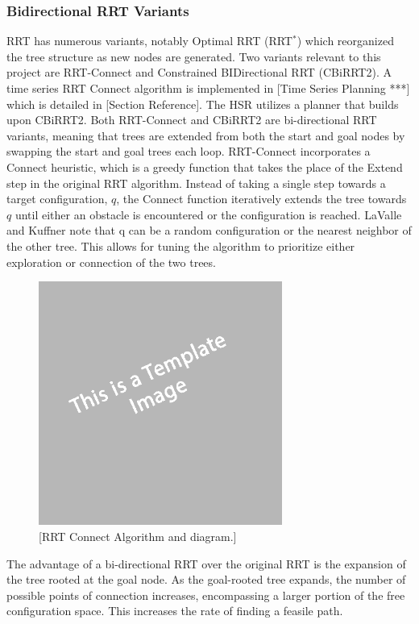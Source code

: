 \documentclass[12pt]{article}
\begin{document}
        \subsubsection{Bidirectional RRT Variants}
            RRT has numerous variants, notably Optimal RRT (RRT\(^*\)) which reorganized the tree structure as new nodes are generated. Two variants relevant to this project are RRT-Connect and Constrained BIDirectional RRT (CBiRRT2). A time series RRT Connect algorithm is implemented in [Time Series Planning ***] which is detailed in [Section Reference]. The HSR utilizes a planner that builds upon CBiRRT2. Both RRT-Connect and CBiRRT2 are bi-directional RRT variants, meaning that trees are extended from both the start and goal nodes by swapping the start and goal trees each loop. RRT-Connect incorporates a Connect heuristic, which is a greedy function that takes the place of the Extend step in the original RRT algorithm. Instead of taking a single step towards a target configuration, \(q\), the Connect function iteratively extends the tree towards \(q\) until either an obstacle is encountered or the configuration is reached. LaValle and Kuffner note that q can be a random configuration or the nearest neighbor of the other tree. This allows for tuning the algorithm to prioritize either exploration or connection of the two trees.
            \begin{figure}[ht][ht]
                \includegraphics[width=8cm]{temp}
                \centering
                \caption{[RRT Connect Algorithm and diagram.]}
            \end{figure}

            \par The advantage of a bi-directional RRT over the original RRT is the expansion of the tree rooted at the goal node. As the goal-rooted tree expands, the number of possible points of connection increases, encompassing a larger portion of the free configuration space. This increases the rate of finding a feasile path.
            
\end{document}
